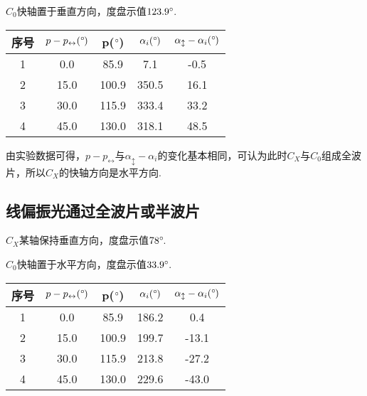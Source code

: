 \documentclass{thureport}
\def\de{{\ensuremath{^\circ\hspace{-0.09em}}}}
\begin{document}
$C_0$快轴置于垂直方向，度盘示值$123.9\de$.

\begin{table}[H]
    \centering
      \begin{tabular}{|c|c|c|c|c|}
      \hline
      序号    & $p-p_{\leftrightarrow}(\de)$ & p(\de) & $\alpha_i(\de)$ & $\alpha_{\updownarrow}-\alpha_i(\de)$ \bigstrut\\
      \hline
      1     & 0.0   & 85.9  & 7.1   & -0.5  \bigstrut\\
      \hline
      2     & 15.0  & 100.9  & 350.5  & 16.1  \bigstrut\\
      \hline
      3     & 30.0  & 115.9  & 333.4  & 33.2  \bigstrut\\
      \hline
      4     & 45.0  & 130.0  & 318.1  & 48.5  \bigstrut\\
      \hline
      \end{tabular}%
\end{table}%

由实验数据可得，$p-p_{\leftrightarrow}$与$\alpha_{\updownarrow}-\alpha_i$的变化基本相同，可认为此时$C_X$与$C_0$组成全波片，所以$C_X$的快轴方向是水平方向.

\subsection{线偏振光通过全波片或半波片}
$C_X$某轴保持垂直方向，度盘示值$78\de$.

$C_0$快轴置于水平方向，度盘示值$33.9\de$.

\begin{table}[H]
    \centering
      \begin{tabular}{|c|c|c|c|c|}
      \hline
      序号    & $p-p_{\leftrightarrow}(\de)$ & p(\de) & $\alpha_i(\de)$ & $\alpha_{\updownarrow}-\alpha_i(\de)$ \bigstrut\\
      \hline
      1     & 0.0   & 85.9  & 186.2  & 0.4  \bigstrut\\
      \hline
      2     & 15.0  & 100.9  & 199.7  & -13.1  \bigstrut\\
      \hline
      3     & 30.0  & 115.9  & 213.8  & -27.2  \bigstrut\\
      \hline
      4     & 45.0  & 130.0  & 229.6  & -43.0  \bigstrut\\
      \hline
      \end{tabular}%
\end{table}%
\end{document}
